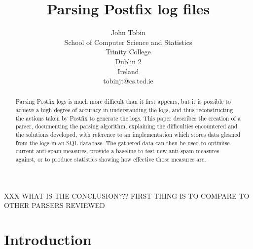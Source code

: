 \documentclass[a4paper,12pt,draft]{article}
\newcounter{dummy}
\begin{document}


\title{Parsing Postfix log files}
\author{John Tobin \\ School of Computer Science and Statistics \\
Trinity College \\ Dublin 2 \\ Ireland \\ tobinjt@cs.tcd.ie}
\maketitle

\begin{abstract}

    Parsing Postfix logs is much more difficult than it first appears, but
    it is possible to achieve a high degree of accuracy in understanding
    the logs, and thus reconstructing the actions taken by Postfix to
    generate the logs.  This paper describes the creation of a parser,
    documenting the parsing algorithm, explaining the difficulties
    encountered and the solutions developed, with reference to an
    implementation which stores data gleaned from the logs in an SQL
    database.  The gathered data can then be used to optimise current
    anti-spam measures, provide a baseline to test new anti-spam measures
    against, or to produce statistics showing how effective those measures
    are.

\end{abstract}

XXX WHAT IS THE CONCLUSION???  FIRST THING IS TO COMPARE TO OTHER PARSERS
REVIEWED

\newpage
\tableofcontents
\listoffigures
\listoftables

\newpage
\section{Introduction}

\label{introduction}
\end{document}
